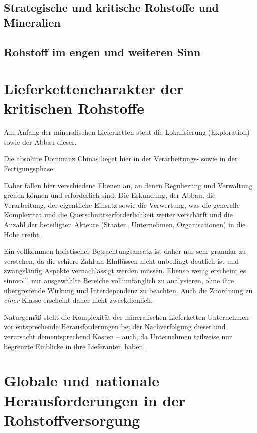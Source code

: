 \documentclass[12pt,a4paper,oneside]{book} %
\begin{document}
	\subsection{Strategische und kritische Rohstoffe und Mineralien}
	
	\subsection{Rohstoff im engen und weiteren Sinn}
	
	\section{Lieferkettencharakter der kritischen Rohstoffe}
	
	Am Anfang der mineralischen Lieferketten steht die Lokalisierung (Exploration) sowie der Abbau dieser.
	
	
	
	Die absolute Dominanz Chinas lieget hier in der Verarbeitungs- sowie in der Fertigungsphase.
	
	
	
	Daher fallen hier verschiedene Ebenen an, an denen Regulierung und Verwaltung greifen können und erforderlich sind: Die Erkundung, der Abbau, die Verarbeitung, der eigentliche Einsatz sowie die Verwertung, was die generelle Komplexität und die Querschnittserforderlichkeit weiter verschärft und die Anzahl der beteiligten Akteure (Staaten, Unternehmen, Organisationen) in die Höhe treibt.
	
	Ein vollkommen holistischer Betrachtungsansatz ist daher nur sehr granular zu verstehen, da die schiere Zahl an EInflüssen nicht unbedingt deutlich ist und zwangsläufig Aspekte vernachlässigt werden müssen. Ebenso wenig erscheint es sinnvoll, nur ausgewählte Bereiche vollumfänglich zu analysieren, ohne ihre übergreifende Wirkung und Interdependenz zu beachten. Auch die Zuordnung zu \textit{einer} Klasse erscheint daher nicht zweckdienlich.
	
	Naturgemäß stellt die Komplexität der mineralischen Lieferketten Unternehmen vor entsprechende Herausforderungen bei der Nachverfolgung dieser und verursacht dementsprechend Kosten -- auch, da Unternehmen teilweise nur begrenzte Einblicke in ihre Lieferanten haben.\autocite{Jumping the Chain: How Downstream Manufacturers Engage with Deep Suppliers of Conflict Minerals}
	
	\section{Globale und nationale Herausforderungen in der Rohstoffversorgung}
	
\end{document}
